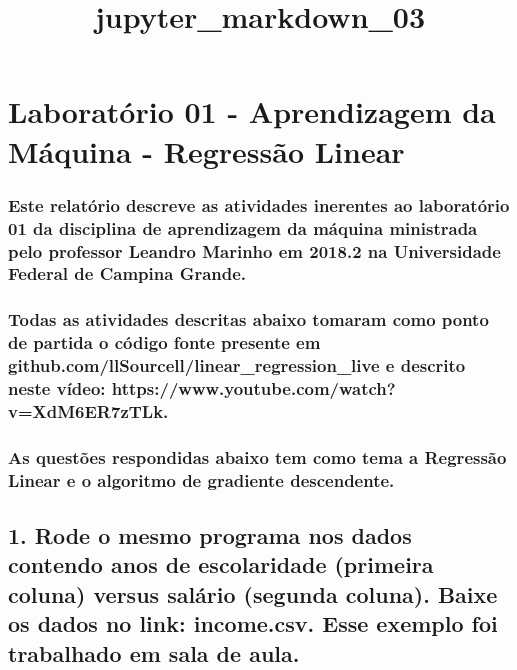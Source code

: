 \documentclass[11pt]{article}
\title{jupyter\_markdown\_03}
\begin{document}
    
    
    \maketitle
    
    

    
    \section{Laboratório 01 - Aprendizagem da Máquina - Regressão
Linear}\label{laboratuxf3rio-01---aprendizagem-da-muxe1quina---regressuxe3o-linear}

\subsubsection{Este relatório descreve as atividades inerentes ao
laboratório 01 da disciplina de aprendizagem da máquina ministrada pelo
professor Leandro Marinho em 2018.2 na Universidade Federal de Campina
Grande.}\label{este-relatuxf3rio-descreve-as-atividades-inerentes-ao-laboratuxf3rio-01-da-disciplina-de-aprendizagem-da-muxe1quina-ministrada-pelo-professor-leandro-marinho-em-2018.2-na-universidade-federal-de-campina-grande.}

\subsubsection{Todas as atividades descritas abaixo tomaram como ponto
de partida o código fonte presente em
github.com/llSourcell/linear\_regression\_live e descrito neste vídeo:
https://www.youtube.com/watch?v=XdM6ER7zTLk.}\label{todas-as-atividades-descritas-abaixo-tomaram-como-ponto-de-partida-o-cuxf3digo-fonte-presente-em-github.comllsourcelllinear_regression_live-e-descrito-neste-vuxeddeo-httpswww.youtube.comwatchvxdm6er7ztlk.}

\subsubsection{As questões respondidas abaixo tem como tema a Regressão
Linear e o algoritmo de gradiente
descendente.}\label{as-questuxf5es-respondidas-abaixo-tem-como-tema-a-regressuxe3o-linear-e-o-algoritmo-de-gradiente-descendente.}

    \subsection{1. Rode o mesmo programa nos dados contendo anos de
escolaridade (primeira coluna) versus salário (segunda coluna). Baixe os
dados no link: income.csv. Esse exemplo foi trabalhado em sala de
aula.}\label{rode-o-mesmo-programa-nos-dados-contendo-anos-de-escolaridade-primeira-coluna-versus-saluxe1rio-segunda-coluna.-baixe-os-dados-no-link-income.csv.-esse-exemplo-foi-trabalhado-em-sala-de-aula.}
\end{document}
